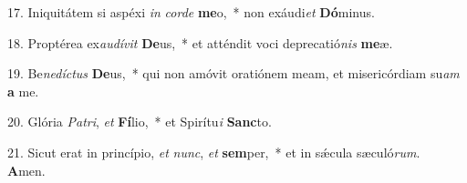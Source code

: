 17. Iniquitátem si aspéxi \textit{in} \textit{cor}\textit{de} \textbf{me}o,~*  non exáudi\textit{et} \textbf{Dó}minus.\

18. Proptérea ex\textit{au}\textit{dí}\textit{vit} \textbf{De}us,~*  et atténdit voci deprecatió\textit{nis} \textbf{me}æ.\

19. Be\textit{ne}\textit{díc}\textit{tus} \textbf{De}us,~*  qui non amóvit oratiónem meam, et misericórdiam su\textit{am} \textbf{a} me.\

20. Glória \textit{Pa}\textit{tri}, \textit{et} \textbf{Fí}lio,~*  et Spirítu\textit{i} \textbf{Sanc}to.\

21. Sicut erat in princípio, \textit{et} \textit{nunc}, \textit{et} \textbf{sem}per,~*  et in sǽcula sæculó\textit{rum}. \textbf{A}men.\


